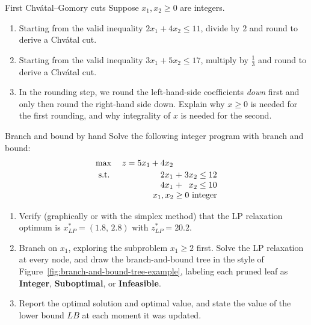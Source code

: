 \begin{ex}{First Chv\'atal--Gomory cuts}{}
\label{ex:ch13-cg-warmup}
Suppose $x_1, x_2 \geq 0$ are integers.
\begin{enumerate}
\item Starting from the valid inequality $2x_1 + 4x_2 \leq 11$, divide by $2$
and round to derive a Chv\'atal cut.
\item Starting from the valid inequality $3x_1 + 5x_2 \leq 17$, multiply by
$\tfrac{1}{3}$ and round to derive a Chv\'atal cut.
\item In the rounding step, we round the left-hand-side coefficients
\emph{down} first and only then round the right-hand side down.  Explain why
$x \geq 0$ is needed for the first rounding, and why integrality of $x$ is
needed for the second.
\end{enumerate}
\exrefs{\S\ref{subsec:chvatal-cuts}}
\end{ex}


\begin{ex}{Branch and bound by hand}{}
\label{ex:ch13-bb-hand}
Solve the following integer program with branch and bound:
\[
\begin{array}{l r@{\;}c@{\;}r@{\;}c@{\;}r}
\max & z = 5x_1 + 4x_2 & & & & \\[2pt]
\st  & 2x_1 & + & 3x_2 & \leq & 12 \\
     & 4x_1 & + & x_2  & \leq & 10 \\
     & \multicolumn{5}{r}{x_1, x_2 \geq 0 \text{ integer}}
\end{array}
\]
\begin{enumerate}
\item Verify (graphically or with the simplex method) that the LP relaxation
optimum is $x^*_{LP} = (1.8,\, 2.8)$ with $z^*_{LP} = 20.2$.
\item Branch on $x_1$, exploring the subproblem $x_1 \geq 2$ first.  Solve the
LP relaxation at every node, and draw the branch-and-bound tree in the style
of Figure~\ref{fig:branch-and-bound-tree-example}, labeling each pruned leaf
as \textbf{Integer}, \textbf{Suboptimal}, or \textbf{Infeasible}.
\item Report the optimal solution and optimal value, and state the value of
the lower bound $LB$ at each moment it was updated.
\end{enumerate}
\end{ex}

